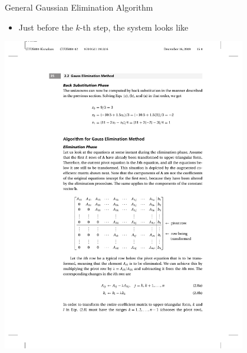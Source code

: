 \documentclass{beamer}
\newcommand{\beforeverb}{\footnotesize}
\begin{document}
\begin{frame}{General Gaussian Elimination Algorithm}
\begin{itemize}
\item Just before the $k$-th step, the system looks like
\end{itemize}
\centerline{\includegraphics[width=0.8\textwidth]{Lec10_Fig2}}

\end{frame}
\end{document}
